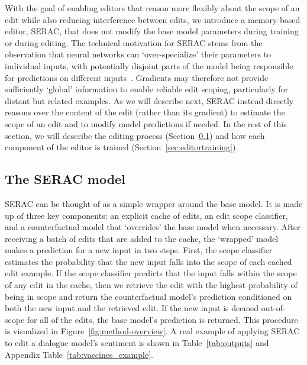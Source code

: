 \documentclass{article}
\newcommand{\name}{SERAC}
\begin{document}
With the goal of enabling editors that reason more flexibly about the scope of an edit while also reducing interference between edits, we introduce a memory-based editor, {\name}, that does not modify the base model parameters during training or during editing. The technical motivation for {\name} stems from the observation that neural networks can `over-specialize' their parameters to individual inputs, with potentially disjoint parts of the model being responsible for predictions on different inputs~\citep{csordas2021are}. Gradients may therefore not provide sufficiently `global' information to enable reliable edit scoping, particularly for distant but related examples. As we will describe next, {\name} instead directly reasons over the content of the edit (rather than its gradient) to estimate the scope of an edit and to modify model predictions if needed. In the rest of this section, we will describe the editing process (Section~\ref{sec:editor}) and how each component of the editor is trained (Section~\ref{sec:editortraining}).

\subsection{The {\name} model}
\label{sec:editor}

{\name} can be thought of as a simple wrapper around the base model. It is made up of three key components: an explicit cache of edits, an edit scope classifier, and a counterfactual model that `overrides' the base model when necessary. After receiving a batch of edits that are added to the cache, the `wrapped' model makes a prediction for a new input in two steps. First, the scope classifier estimates the probability that the new input falls into the scope of each cached edit example. If the scope classifier predicts that the input falls within the scope of any edit in the cache, then we retrieve the edit with the highest probability of being in scope and return the counterfactual model's prediction conditioned on both the new input and the retrieved edit. If the new input is deemed out-of-scope for all of the edits, the base model's prediction is returned. This procedure is visualized in Figure~\ref{fig:method-overview}. A real example of applying {\name} to edit a dialogue model's sentiment is shown in Table~\ref{tab:outputs} and Appendix Table~\ref{tab:vaccines_example}.
\end{document}
